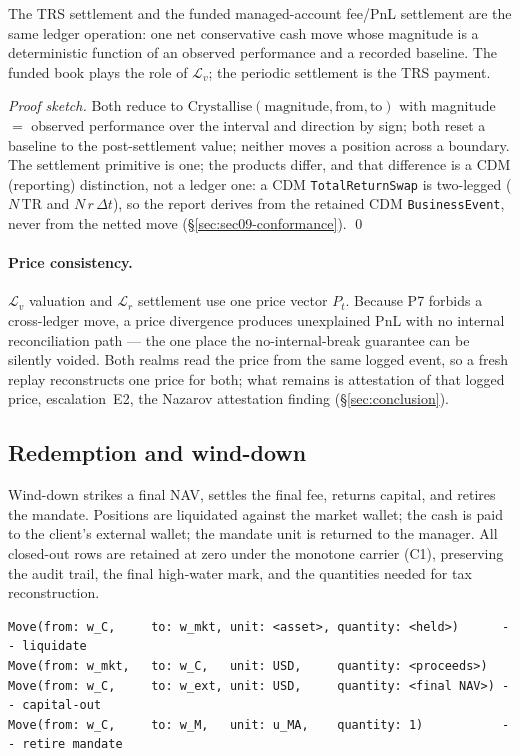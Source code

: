 \begin{theorem}
\label{thm:trs-equiv}
The TRS settlement and the funded managed-account fee/PnL settlement are the same ledger
operation: one net conservative cash move whose magnitude is a deterministic function of an
observed performance and a recorded baseline. The funded book plays the role of $\mathcal{L}_v$;
the periodic settlement is the TRS payment.
\end{theorem}
\noindent\textit{Proof sketch.} Both reduce to
$\mathrm{Crystallise}(\text{magnitude},\text{from},\text{to})$ with magnitude $=$ observed
performance over the interval and direction by sign; both reset a baseline to the post-settlement
value; neither moves a position across a boundary. The settlement primitive is one; the products
differ, and that difference is a CDM (reporting) distinction, not a ledger one: a CDM
\texttt{TotalReturnSwap} is two-legged ($N\,\mathrm{TR}$ and $N\,r\,\Delta t$), so the report
derives from the retained CDM \texttt{BusinessEvent}, never from the netted move
(\S\ref{sec:sec09-conformance}). \qed

\paragraph{Price consistency.} $\mathcal{L}_v$ valuation and $\mathcal{L}_r$ settlement use one
price vector $P_t$. Because P7 forbids a cross-ledger move, a price divergence produces unexplained
PnL with no internal reconciliation path --- the one place the no-internal-break guarantee can be
silently voided. Both realms read the price from the same logged event, so a fresh replay
reconstructs one price for both; what remains is attestation of that logged price, escalation~E2,
the Nazarov attestation finding (\S\ref{sec:conclusion}).

\subsection{Redemption and wind-down}
\label{sec:sec09-redemption}

Wind-down strikes a final NAV, settles the final fee, returns capital, and retires the mandate.
Positions are liquidated against the market wallet; the cash is paid to the client's external
wallet; the mandate unit is returned to the manager. All closed-out rows are retained at zero under
the monotone carrier (C1), preserving the audit trail, the final high-water mark, and the
quantities needed for tax reconstruction.
\begin{lstlisting}
Move(from: w_C,     to: w_mkt, unit: <asset>, quantity: <held>)      -- liquidate
Move(from: w_mkt,   to: w_C,   unit: USD,     quantity: <proceeds>)
Move(from: w_C,     to: w_ext, unit: USD,     quantity: <final NAV>) -- capital-out
Move(from: w_C,     to: w_M,   unit: u_MA,    quantity: 1)           -- retire mandate
\end{lstlisting}


